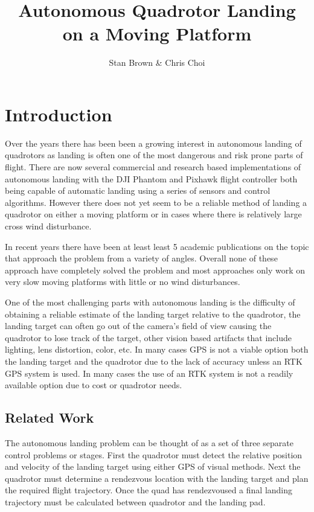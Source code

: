 \documentclass[11pt, twocolumn]{article}
\begin{document}
\title{Autonomous Quadrotor Landing on a Moving Platform}
\author{Stan Brown \& Chris Choi}
\date{}
\maketitle

\section{Introduction}
Over the years there has been been a growing interest in autonomous landing of quadrotors as landing is often one of the most dangerous and risk prone parts of flight. There are now several commercial and research based implementations of autonomous landing with the DJI Phantom and Pixhawk flight controller both being capable of automatic landing using a series of sensors and control algorithms. However there does not yet seem to be a reliable method of landing a quadrotor on either a moving platform or in cases where there is relatively large cross wind disturbance. 

In recent years there have been at least least 5 academic publications on the topic \cite{Lee2012, Kim2014, Voos2010, Friis2009, Ling2014, Herisse2012} that approach the problem from a variety of angles. Overall none of these approach have completely solved the problem and most approaches only work on very slow moving platforms with little or no wind disturbances. 

One of the most challenging parts with autonomous landing is the difficulty of obtaining a reliable estimate of the landing target relative to the quadrotor, the landing target can often go out of the camera's field of view causing the quadrotor to lose track of the target, other vision based artifacts that include lighting, lens distortion, color, etc. In many cases GPS is not a viable option both the landing target and the quadrotor due to the lack of accuracy unless an RTK GPS system is used. In many cases the use of an RTK system is not a readily available option due to cost or quadrotor needs. 

\subsection{Related Work}
The autonomous landing problem can be thought of as a set of three separate control problems or stages. First the quadrotor must detect the relative position and velocity of the landing target using either GPS of visual methods. Next the quadrotor must determine a rendezvous location with the landing target and plan the required flight trajectory. Once the quad has rendezvoused a final landing trajectory must be calculated between quadrotor and the landing pad. 
\end{document}
